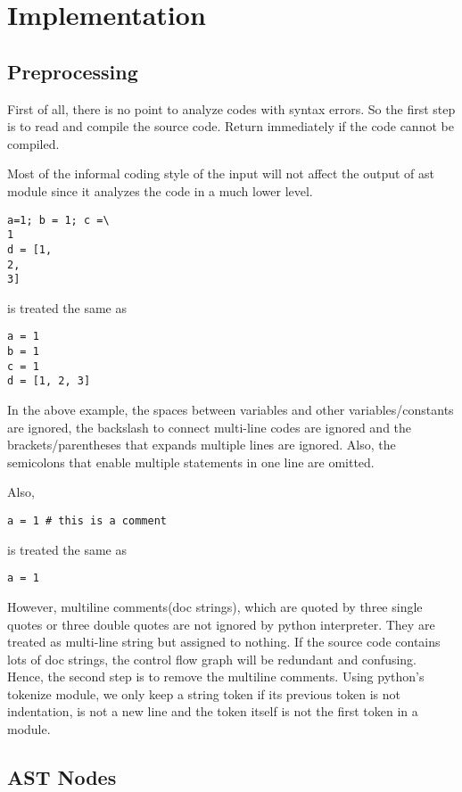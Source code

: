\documentclass[11pt]{article}
\begin{document}
\section{Implementation}\label{section-implementation}
\subsection{Preprocessing}

First of all, there is no point to analyze codes with syntax errors. So the first step is to read and compile the source code. Return immediately if the code cannot be compiled.

Most of the informal coding style of the input will not affect the output of ast module since it analyzes the code in a much lower level. 
\begin{lstlisting}
a=1; b = 1; c =\
1
d = [1,
2,
3]
\end{lstlisting}
is treated the same as
\begin{lstlisting}
a = 1
b = 1
c = 1
d = [1, 2, 3]
\end{lstlisting}
In the above example, the spaces between variables and other variables/constants are ignored, the backslash to connect multi-line codes are ignored and the brackets/parentheses that expands multiple lines are ignored. Also, the semicolons that enable multiple statements in one line are omitted.

Also,
\begin{lstlisting}
a = 1 # this is a comment
\end{lstlisting}
is treated the same as
\begin{lstlisting}
a = 1
\end{lstlisting}

However, multiline comments(doc strings), which are quoted by three single quotes or three double quotes are not ignored by python interpreter. They are treated as multi-line string but assigned to nothing. If the source code contains lots of doc strings, the control flow graph will be redundant and confusing. Hence, the second step is to remove the multiline comments. Using python's tokenize module, we only keep a string token if its previous token is not indentation, is not a new line and the token itself is not the first token in a module.

\subsection{AST Nodes}
\end{document}
